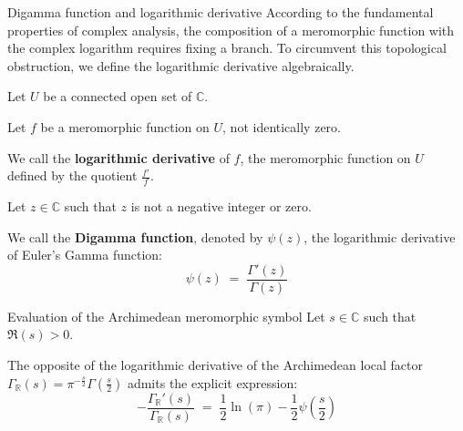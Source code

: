\documentclass[Riemann_Hypothesis.tex]{subfiles}
\begin{document}
\begin{DefNefEn}[label=df:FonctionDigamma]{Digamma function and logarithmic derivative}
    According to the fundamental properties of complex analysis, the composition of a meromorphic function with the complex logarithm requires fixing a branch. To circumvent this topological obstruction, we define the logarithmic derivative algebraically. \par
    Let $U$ be a connected open set of $\mathbb{C}$. \par
    Let $f$ be a meromorphic function on $U$, not identically zero. \par
    We call the \textbf{logarithmic derivative} of $f$, the meromorphic function on $U$ defined by the quotient $\frac{f'}{f}$. \par
    Let $z \in \mathbb{C}$ such that $z$ is not a negative integer or zero. \par
    We call the \textbf{Digamma function}, denoted by $\psi(z)$, the logarithmic derivative of Euler's Gamma function:
    \begin{equation*}
        \psi(z) \;=\; \frac{\Gamma'(z)}{\Gamma(z)}
    \end{equation*}
\end{DefNefEn}

\begin{propositionEn}[label=pr:CalculDeriveeLogArchimedienne]{Evaluation of the Archimedean meromorphic symbol}
    Let $s \in \mathbb{C}$ such that $\Re(s) > 0$. \par
    The opposite of the logarithmic derivative of the Archimedean local factor $\Gamma_{\mathbb{R}}(s) = \pi^{-\frac{s}{2}} \Gamma\left(\frac{s}{2}\right)$ admits the explicit expression:
    \begin{equation*}
        -\frac{\Gamma_{\mathbb{R}}'(s)}{\Gamma_{\mathbb{R}}(s)} \;=\; \frac{1}{2}\ln(\pi) - \frac{1}{2}\psi\left(\frac{s}{2}\right)
    \end{equation*}
\end{propositionEn}
\end{document}
